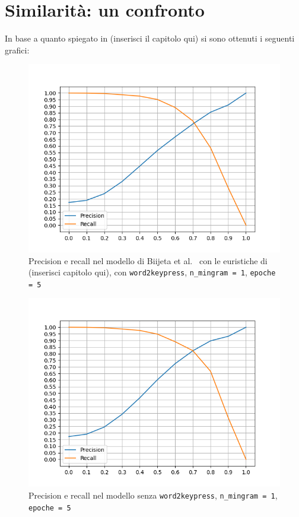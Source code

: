\section{Similarità: un confronto}
\label{sec:similarita, confronto tra modelli}
In base a quanto spiegato in (inserisci il capitolo qui) si sono ottenuti i seguenti grafici:
\begin{figure}[H]
    \centering
    \includegraphics[width=14cm]{./immagini/CORRETTO_w2kp_nmingram=1_epochs=5.png}
    \caption{Precision e recall nel modello di Biijeta et al.~\cite{biijeta} con le euristiche di (inserisci capitolo qui), con \texttt{word2keypress}, \texttt{n\_mingram = 1}, \texttt{epoche = 5}}
    \label{primomodello}
\end{figure}
\begin{figure}[H]
    \centering
    \includegraphics[width=14cm]{./immagini/no_w2kp_nmingram=1_epochs=5.png}
    \caption{Precision e recall nel modello senza \texttt{word2keypress}, \texttt{n\_mingram = 1}, \texttt{epoche = 5}}
    \label{secondomodello}
\end{figure}

